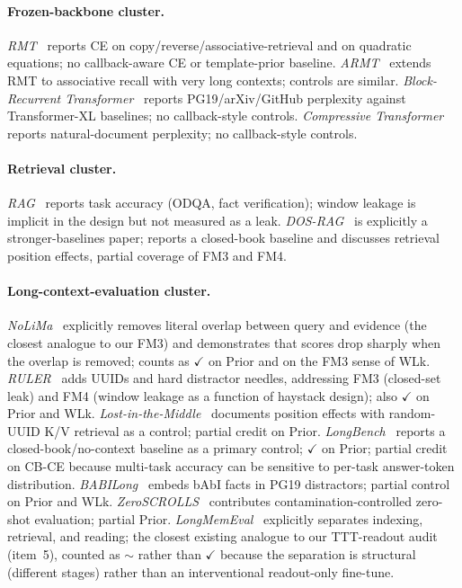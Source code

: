 \documentclass{article}
\begin{document}
\paragraph{Frozen-backbone cluster.}
\emph{RMT}~\cite{rmt2022} reports CE on
copy/reverse/associative-retrieval and on quadratic equations; no
callback-aware CE or template-prior baseline.
\emph{ARMT}~\cite{armt2024} extends RMT to associative recall with
very long contexts; controls are similar.
\emph{Block-Recurrent Transformer}~\cite{blockrecurrent2022} reports
PG19/arXiv/GitHub perplexity against Transformer-XL baselines; no
callback-style controls.  \emph{Compressive
Transformer}~\cite{compressive2019} reports natural-document
perplexity; no callback-style controls.

\paragraph{Retrieval cluster.}
\emph{RAG}~\cite{ragoriginal2020} reports task accuracy (ODQA, fact
verification); window leakage is implicit in the design but not
measured as a leak.  \emph{DOS-RAG}~\cite{ragbaseline2025} is
explicitly a stronger-baselines paper; reports a closed-book
baseline and discusses retrieval position effects, partial coverage
of FM3 and FM4.

\paragraph{Long-context-evaluation cluster.}
\emph{NoLiMa}~\cite{nolima2025} explicitly removes literal overlap
between query and evidence (the closest analogue to our FM3) and
demonstrates that scores drop sharply when the overlap is removed;
counts as $\checkmark$ on Prior and on the FM3 sense of WLk.
\emph{RULER}~\cite{ruler2024} adds UUIDs and hard distractor
needles, addressing FM3 (closed-set leak) and FM4 (window leakage as
a function of haystack design); also $\checkmark$ on Prior and WLk.
\emph{Lost-in-the-Middle}~\cite{lostmiddle2024} documents position
effects with random-UUID K/V retrieval as a control; partial credit
on Prior.  \emph{LongBench}~\cite{longbench2024} reports a
closed-book/no-context baseline as a primary control; $\checkmark$
on Prior; partial credit on CB-CE because multi-task accuracy can be
sensitive to per-task answer-token distribution.
\emph{BABILong}~\cite{babilong2024} embeds bAbI facts in PG19
distractors; partial control on Prior and WLk.
\emph{ZeroSCROLLS}~\cite{zeroscrolls2023} contributes
contamination-controlled zero-shot evaluation; partial Prior.
\emph{LongMemEval}~\cite{longmemeval2025} explicitly separates
indexing, retrieval, and reading; the closest existing analogue to
our TTT-readout audit (item~5), counted as $\sim$ rather than
$\checkmark$ because the separation is structural (different stages)
rather than an interventional readout-only fine-tune.
\end{document}
